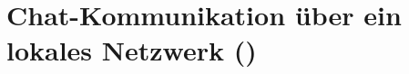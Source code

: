 \section{\texorpdfstring{Chat-Kommunikation über ein lokales Netzwerk ()}{Chat-Kommunikation über ein lokales Netzwerk (LAN)}}




